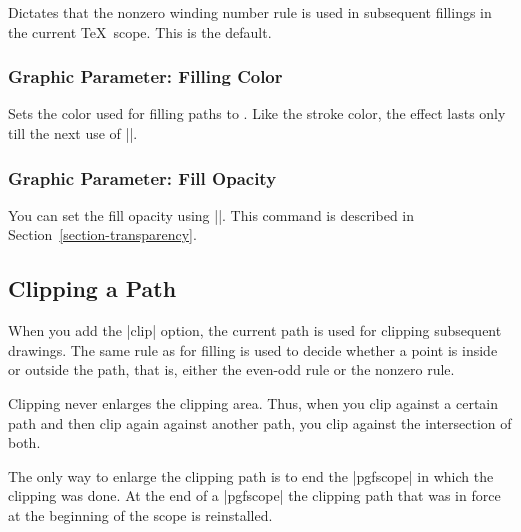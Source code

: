 \begin{command}{\pgfsetnonzerorule}
  Dictates that the nonzero winding number rule is used in subsequent
  fillings in the current \TeX\ scope. This is the default.

\begin{codeexample}[]
\begin{pgfpicture}
  \pgfsetnonzerorule
  \pgfpathcircle{\pgfpoint{0mm}{0cm}}{7mm}
  \pgfpathcircle{\pgfpoint{5mm}{0cm}}{7mm}
\end{pgfpicture}
\end{codeexample}
\end{command}

\subsubsection{Graphic Parameter: Filling Color}

\begin{command}{\pgfsetfillcolor{}}
  Sets the color used for filling paths to . Like the
  stroke color, the effect lasts only till the next use of |\color|. 
\end{command}


\subsubsection{Graphic Parameter: Fill Opacity}

You can set the fill opacity using |\pgfsetfillopacity|. This
command is described in Section~\ref{section-transparency}.

\subsection{Clipping a Path}
\label{section-clip}

When you add the |clip| option, the current path is used for
clipping subsequent drawings. The same rule as for filling is used to
decide whether a point is inside or outside the path, that is, either
the even-odd rule or the nonzero rule.

Clipping never enlarges the clipping area. Thus, when you clip against
a certain path and then clip again against another path, you clip
against the intersection of both.

The only way to enlarge the clipping path is to end the |{pgfscope}|
in which the clipping was done. At the end of a |{pgfscope}| the
clipping path that was in force at the beginning of the scope is
reinstalled. 

